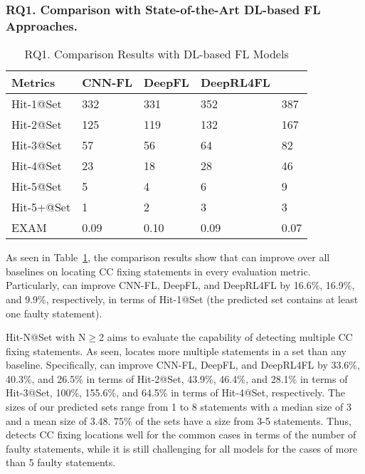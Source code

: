 \subsubsection{\bf RQ1. Comparison with State-of-the-Art DL-based FL Approaches.}
\label{sec:rq1-result}

\begin{table}[t]
	\caption{RQ1. Comparison Results with DL-based FL Models}
        \vspace{-6pt}
	{\small
		\begin{center}
			\renewcommand{\arraystretch}{1}
				\begin{tabular}{p{1.5cm}<{\centering}|p{1cm}<{\centering}|p{0.8cm}<{\centering}|p{1.2cm}<{\centering}|p{1.2cm}<{\centering}}
				\hline
				Metrics & CNN-FL & DeepFL & DeepRL4FL & \tool \\			
				\hline
				Hit-1@Set   & 332 & 331 & 352 & 387 \\
				Hit-2@Set	& 125 & 119 & 132 & 167 \\
				Hit-3@Set	& 57 & 56 & 64 & 82 \\
				Hit-4@Set	& 23 & 18 & 28 & 46 \\
				Hit-5@Set	& 5 & 4 & 6 & 9 \\
				Hit-5+@Set	& 1 & 2 & 3 & 3 \\
				EXAM     	& 0.09 & 0.10 & 0.09 & 0.07 \\
				\hline
			\end{tabular}
			
			\label{fig:rq1-0}
		\end{center}
	}
\end{table}

As seen in Table~\ref{fig:rq1-0}, the comparison results show that
{\tool} can improve over all baselines on locating CC fixing
statements in every evaluation metric. Particularly, {\tool} can
improve CNN-FL, DeepFL, and DeepRL4FL by 16.6\%, 16.9\%, and 9.9\%,
respectively, in terms of Hit-1@Set (the predicted set contains at
least one faulty statement).

Hit-N@Set with N$\geq$2 aims to evaluate the capability of detecting
multiple CC fixing statements. As seen, {\tool} locates more multiple
statements in a set than any baseline. Specifically, {\tool} can
improve CNN-FL, DeepFL, and DeepRL4FL by 33.6\%, 40.3\%, and 26.5\% in
terms of Hit-2@Set, 43.9\%, 46.4\%, and 28.1\% in terms of Hit-3@Set,
100\%, 155.6\%, and 64.5\% in terms of Hit-4@Set, respectively.
%
The sizes of our predicted sets range from 1 to 8 statements with a
median size of 3 and a mean size of 3.48. 75\% of the sets have a size
from 3-5 statements.
Thus, {\tool} detects CC fixing locations well for the common cases in
terms of the number of faulty statements, while it is still
challenging for all models for the cases of more than 5 faulty
statements.


